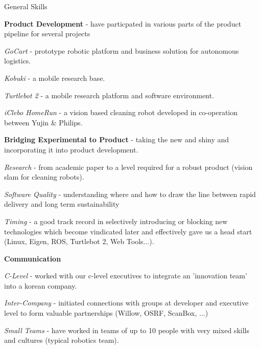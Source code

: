 \documentclass[a4paper,10pt]{article}
\begin{document}
\begin{cvsection}{General Skills}
 \raggedright
  \begin{djs_itemize}
    \item \textbf{Product Development} - have particpated in various parts of the product pipeline for several projects
    \begin{djs_itemize}
      \item \textit{GoCart} - prototype robotic platform and business solution for autonomous logistics.
      \item \textit{Kobuki} - a mobile research base.
      \item \textit{Turtlebot 2} - a mobile research platform and software environment.
      \item \textit{iClebo HomeRun} - a vision based cleaning robot developed in co-operation between Yujin \& Philips.
    \end{djs_itemize}
    \item \textbf{Bridging Experimental to Product} - taking the new and shiny and incorporating it into product development.
    \begin{djs_itemize}
      \item \textit{Research} - from academic paper to a level required for a robust product (vision slam for cleaning robots).
      \item \textit{Software Quality} - understanding where and how to draw the line between rapid delivery and long term sustainability
      \item \textit{Timing} - a good track record in selectively introducing or blocking new technologies which become vindicated later and effectively gave us a head start (Linux, Eigen, ROS, Turtlebot 2, Web Tools...).
    \end{djs_itemize}
    \item \textbf{Communication}
    \begin{djs_itemize}
      \item \textit{C-Level} - worked with our c-level executives to integrate an 'innovation team' into a korean company.
      \item \textit{Inter-Company} - initiated connections with groups at developer and executive level to form valuable partnerships (Willow, OSRF, ScanBox, ...)
      \item \textit{Small Teams} - have worked in teams of up to 10 people with very mixed skills and cultures (typical robotics team). 
    \end{djs_itemize}

\end{djs_itemize}
\end{cvsection}
\end{document}
